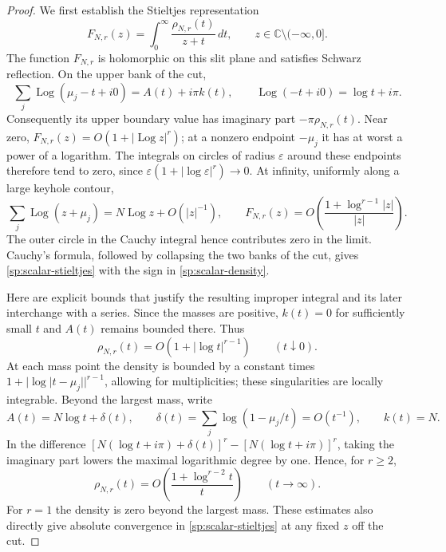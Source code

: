 \documentclass[11pt,letterpaper]{article}
\numberwithin{equation}{section}
\theoremstyle{definition}
\theoremstyle{remark}
\DeclareMathOperator{\Log}{Log}
\begin{document}
\begin{proof}
We first establish the Stieltjes representation
\begin{equation}
 F_{N,r}(z)=\int_0^{\infty}\frac{\rho_{N,r}(t)}{z+t}\,dt,
 \qquad z\in\mathbb C\setminus(-\infty,0].
 \label{sp:scalar-stieltjes}
\end{equation}
The function $F_{N,r}$ is holomorphic on this slit plane and
satisfies Schwarz reflection.  On the upper bank of the cut,
\[
 \sum_j\Log(\mu_j-t+i0)=A(t)+i\pi k(t),
 \qquad \Log(-t+i0)=\log t+i\pi.
\]
Consequently its upper boundary value has imaginary part
$-\pi\rho_{N,r}(t)$.  Near zero,
$F_{N,r}(z)=O(1+|\Log z|^r)$; at a nonzero endpoint $-\mu_j$
it has at worst a power of a logarithm.  The integrals on circles
of radius $\varepsilon$ around these endpoints therefore tend to
zero, since $\varepsilon(1+|\log\varepsilon|^r)\to0$.
At infinity, uniformly along a large keyhole contour,
\[
 \sum_j\Log(z+\mu_j)
       =N\Log z+O(|z|^{-1}),
 \qquad
 F_{N,r}(z)=O\left(\frac{1+\log^{r-1}|z|}{|z|}\right).
\]
The outer circle in the Cauchy integral hence contributes zero
in the limit.  Cauchy's formula, followed by collapsing the two
banks of the cut, gives \eqref{sp:scalar-stieltjes} with the sign
in \eqref{sp:scalar-density}.

Here are explicit bounds that justify the resulting improper
integral and its later interchange with a series.  Since the
masses are positive, $k(t)=0$ for sufficiently small $t$ and
$A(t)$ remains bounded there.  Thus
\begin{equation}
 \rho_{N,r}(t)=O(1+|\log t|^{r-1})\qquad(t\downarrow0).
 \label{sp:density-zero-bound}
\end{equation}
At each mass point the density is bounded by a constant times
$1+|\log|t-\mu_j||^{r-1}$, allowing for multiplicities; these
singularities are locally integrable.  Beyond the largest mass,
write
\[
 A(t)=N\log t+\delta(t),\qquad
 \delta(t)=\sum_j\log(1-\mu_j/t)=O(t^{-1}),\qquad k(t)=N.
\]
In the difference
$[N(\log t+i\pi)+\delta(t)]^r-[N(\log t+i\pi)]^r$,
taking the imaginary part lowers the maximal logarithmic degree
by one.  Hence, for $r\geq2$,
\begin{equation}
 \rho_{N,r}(t)=O\left(\frac{1+\log^{r-2}t}{t}\right)
       \qquad(t\to\infty).
 \label{sp:density-infinity-bound}
\end{equation}
For $r=1$ the density is zero beyond the largest mass.
These estimates also directly give absolute convergence in
\eqref{sp:scalar-stieltjes} at any fixed $z$ off the cut.


\end{proof}
\end{document}
